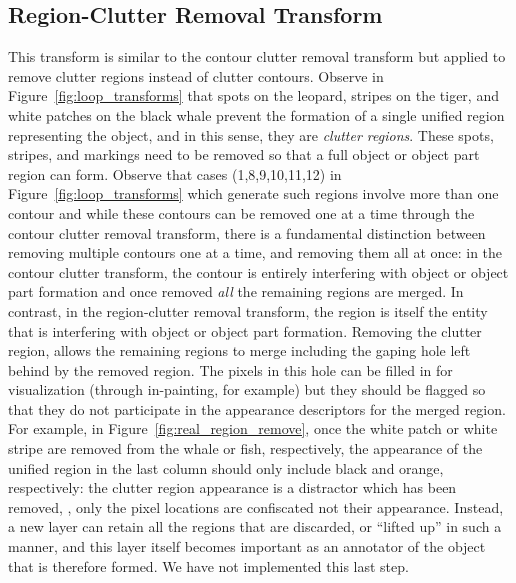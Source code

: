 \subsection{Region-Clutter Removal Transform}
\label{sec:region_clutter}


This transform is similar to the contour clutter removal transform but applied to remove clutter regions instead of clutter contours. Observe in Figure~\ref{fig:loop_transforms} that spots on the leopard, stripes on the tiger, and white patches on the black whale prevent the formation of a single unified region representing the object, and in this sense, they are \emph{clutter regions}. These spots, stripes, and markings need to be removed so that a full object or object part region can form. Observe that cases (1,8,9,10,11,12) in Figure~\ref{fig:loop_transforms} which generate such regions involve more than one contour and while these contours can be removed one at a time through the contour clutter removal transform, there is a fundamental distinction between removing multiple contours one at a time, and removing them all at once: in the contour clutter transform, the contour is entirely interfering with object or object part formation and once removed \emph{all} the remaining regions are merged.  In contrast, in the region-clutter removal transform, the region is itself the entity that is interfering with object or object part formation. Removing the clutter region, allows the remaining regions to merge including the gaping hole left behind by the removed region. The pixels in this hole can be filled in for visualization (through in-painting, for example) but they should be flagged so that they do not participate in the appearance descriptors for the merged region. For example, in Figure~\ref{fig:real_region_remove}, once the white patch or white stripe are removed from the whale or fish, respectively, the appearance of the unified region in the last column should only include black and orange, respectively: the clutter region appearance is a distractor which has been removed, \ie, only the pixel locations are confiscated not their appearance. Instead, a new layer can retain all the regions that are discarded, or ``lifted up'' in such a manner, and this layer itself becomes important as an annotator of the object that is therefore formed. We have not implemented this last step. 



